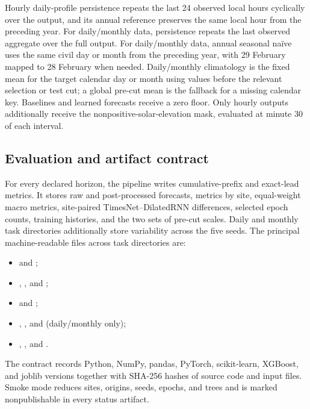 Hourly daily-profile persistence repeats the last 24 observed local hours
cyclically over the output, and its annual reference preserves the same local
hour from the preceding year. For daily/monthly data, persistence repeats the
last observed aggregate over the full output. For daily/monthly data, annual
seasonal na\"ive uses the same civil day or month from the preceding year, with
29 February mapped to 28 February when needed. Daily/monthly climatology is the
fixed mean for the target calendar day or month using values before the
relevant selection or test cut; a global pre-cut mean is the fallback for a
missing calendar key. Baselines and learned forecasts receive a zero floor.
Only hourly outputs additionally receive the nonpositive-solar-elevation mask,
evaluated at minute 30 of each interval.

\subsection{Evaluation and artifact contract}

For every declared horizon, the pipeline writes cumulative-prefix and
exact-lead metrics. It stores raw and post-processed forecasts, metrics by site,
equal-weight macro metrics, site-paired TimesNet--DilatedRNN differences,
selected epoch counts, training histories, and the two sets of pre-cut scales.
Daily and monthly task directories additionally store variability across the
five seeds. The principal machine-readable files across task directories are:
\begin{itemize}
  \item {} and
        ;
  \item {},
        , and
        ;
  \item {} and
        ;
  \item {},
        , and
         (daily/monthly only);
  \item {},
        , and
        .
\end{itemize}
The contract records Python, NumPy, pandas, PyTorch, scikit-learn, XGBoost, and
joblib versions together with SHA-256 hashes of source code and input files.
Smoke mode reduces sites, origins, seeds, epochs, and trees and is marked
nonpublishable in every status artifact.

